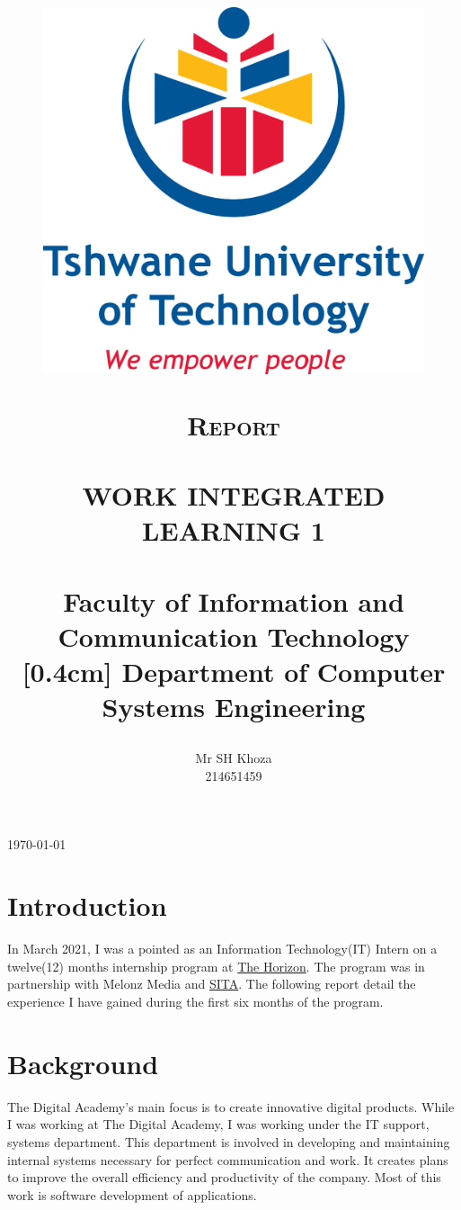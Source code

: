 \documentclass[paper=a4, fontsize=12pt]{scrartcl}
\title{
		\usefont{OT1}{bch}{b}{n}
\begin{figure}[!ht]
	\centering
	\includegraphics[scale=0.15]{./tut_logo.png}
\end{figure}
		\normalfont \normalsize \textsc{Report} \\ %
		\horrule{0.5pt}  \\ [0.4cm]
		\huge WORK INTEGRATED LEARNING 1 \\
		\horrule{2pt} \\[1cm]

	\normalsize 
		{\LARGE{Faculty of Information and Communication Technology \\}}
		[0.4cm]
		Department of Computer Systems Engineering
}
\author{
        Mr SH Khoza \\
	214651459 \\[10pt]%
}
\date{}
\numberwithin{equation}{section}		%
\numberwithin{figure}{section}			%
\numberwithin{table}{section}				%
\begin{document}
\maketitle

\vfill

\today

\clearpage  %

\section{\textbf{Introduction }}
In March 2021, I was a pointed as an Information Technology(IT) Intern on a twelve(12) months internship program at \href{http://www.thehorizon.co.za/}{The Horizon}. The program was in partnership with Melonz Media and \href{http://www.sita.co.za/page/about}{SITA}. The following report detail the experience I have gained during the first six months of the program.

\section{\textbf{Background } }
The Digital Academy’s main focus is to create innovative digital products. While I was working at The Digital Academy, I was working under the IT  support,  systems department. This department is involved in developing and maintaining  internal systems necessary for perfect communication and work. It creates plans to improve the overall efficiency and productivity of the company. Most of this work is software development of applications.


\end{document}

